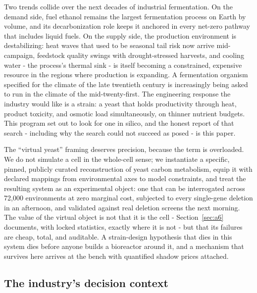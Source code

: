 \documentclass[12pt]{article}
\begin{document}
Two trends collide over the next decades of industrial fermentation.
On the demand side, fuel ethanol remains the largest fermentation
process on Earth by volume, and its decarbonization role keeps it
anchored in every net-zero pathway that includes liquid fuels. On the
supply side, the production environment is destabilizing: heat waves
that used to be seasonal tail risk now arrive mid-campaign, feedstock
quality swings with drought-stressed harvests, and cooling water -
the process's thermal sink - is itself becoming a constrained,
expensive resource in the regions where production is expanding. A
fermentation organism specified for the climate of the late twentieth
century is increasingly being asked to run in the climate of the
mid-twenty-first. The engineering response the industry would like is
a strain: a yeast that holds productivity through heat, product
toxicity, and osmotic load simultaneously, on thinner nutrient
budgets. This program set out to look for one in silico, and the
honest report of that search - including why the search could not
succeed as posed - is this paper.

The ``virtual yeast'' framing deserves precision, because the term is
overloaded. We do not simulate a cell in the whole-cell sense; we
instantiate a specific, pinned, publicly curated reconstruction of
yeast carbon metabolism, equip it with declared mappings from
environmental axes to model constraints, and treat the resulting
system as an experimental object: one that can be interrogated across
72{,}000 environments at zero marginal cost, subjected to every
single-gene deletion in an afternoon, and validated against real
deletion screens the next morning. The value of the virtual object is
not that it is the cell - Section~\ref{sec:a6} documents, with locked
statistics, exactly where it is not - but that its failures are
cheap, total, and auditable. A strain-design hypothesis that dies in
this system dies before anyone builds a bioreactor around it, and a
mechanism that survives here arrives at the bench with quantified
shadow prices attached.


\subsection{The industry's decision context}
\end{document}
